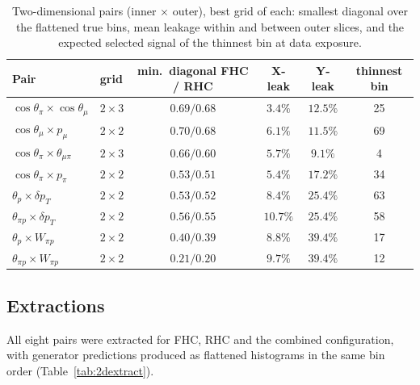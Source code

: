 \begin{table}[H]
  \centering
  \caption{Two-dimensional pairs (inner $\times$ outer), best grid of each: smallest diagonal over the
    flattened true bins, mean leakage within and between outer slices, and the expected selected
    signal of the thinnest bin at data exposure.}
  \label{tab:2dscreen}
  \small
  \begin{tabular}{llcccc}
    \toprule
    Pair & grid & min.\ diagonal FHC / RHC & X-leak & Y-leak & thinnest bin \\
    \midrule
    $\cos\theta_\pi\times\cos\theta_\mu$ & $2\times3$ & $0.69/0.68$ & $3.4\%$ & $12.5\%$ & 25 \\
    $\cos\theta_\mu\times p_\mu$ & $2\times2$ & $0.70/0.68$ & $6.1\%$ & $11.5\%$ & 69 \\
    $\cos\theta_\pi\times\theta_{\mu\pi}$ & $2\times3$ & $0.66/0.60$ & $5.7\%$ & $9.1\%$ & 4 \\
    $\cos\theta_\pi\times p_\pi$ & $2\times2$ & $0.53/0.51$ & $5.4\%$ & $17.2\%$ & 34 \\
    $\theta_p\times\delta p_T$ & $2\times2$ & $0.53/0.52$ & $8.4\%$ & $25.4\%$ & 63 \\
    $\theta_{\pi p}\times\delta p_T$ & $2\times2$ & $0.56/0.55$ & $10.7\%$ & $25.4\%$ & 58 \\
    $\theta_p\times W_{\pi p}$ & $2\times2$ & $0.40/0.39$ & $8.8\%$ & $39.4\%$ & 17 \\
    $\theta_{\pi p}\times W_{\pi p}$ & $2\times2$ & $0.21/0.20$ & $9.7\%$ & $39.4\%$ & 12 \\
    \bottomrule
  \end{tabular}
\end{table}

\subsection{Extractions}

All eight pairs were extracted for FHC, RHC and the combined configuration, with generator
predictions produced as flattened histograms in the same bin order (Table~\ref{tab:2dextract}).

